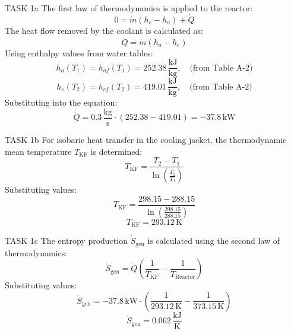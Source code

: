 TASK 1a  
The first law of thermodynamics is applied to the reactor:  
\[
0 = \dot{m}(h_e - h_a) + \dot{Q}
\]  
The heat flow removed by the coolant is calculated as:  
\[
\dot{Q} = \dot{m}(h_a - h_e)
\]  
Using enthalpy values from water tables:  
\[
h_a(T_1) = h_{af}(T_1) = 252.38 \, \frac{\text{kJ}}{\text{kg}}, \quad \text{(from Table A-2)}
\]  
\[
h_e(T_2) = h_{ef}(T_2) = 419.01 \, \frac{\text{kJ}}{\text{kg}}, \quad \text{(from Table A-2)}
\]  
Substituting into the equation:  
\[
\dot{Q} = 0.3 \, \frac{\text{kg}}{\text{s}} \cdot (252.38 - 419.01) = -37.8 \, \text{kW}
\]  

TASK 1b  
For isobaric heat transfer in the cooling jacket, the thermodynamic mean temperature \( T_{\text{KF}} \) is determined:  
\[
T_{\text{KF}} = \frac{T_2 - T_1}{\ln\left(\frac{T_2}{T_1}\right)}
\]  
Substituting values:  
\[
T_{\text{KF}} = \frac{298.15 - 288.15}{\ln\left(\frac{298.15}{288.15}\right)}
\]  
\[
T_{\text{KF}} = 293.12 \, \text{K}
\]  

TASK 1c  
The entropy production \( \dot{S}_{\text{gen}} \) is calculated using the second law of thermodynamics:  
\[
\dot{S}_{\text{gen}} = \dot{Q} \left( \frac{1}{T_{\text{KF}}} - \frac{1}{T_{\text{Reactor}}} \right)
\]  
Substituting values:  
\[
\dot{S}_{\text{gen}} = -37.8 \, \text{kW} \cdot \left( \frac{1}{293.12 \, \text{K}} - \frac{1}{373.15 \, \text{K}} \right)
\]  
\[
\dot{S}_{\text{gen}} = 0.062 \, \frac{\text{kJ}}{\text{K}}
\]
